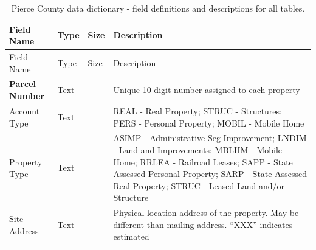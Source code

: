 \documentclass[
  english,
  letterpaper,
  DIV=11,
  numbers=noendperiod]{scrreprt}
\begin{document}
\begin{longtable}[]{@{}
  >{\raggedright\arraybackslash}p{}
  >{\raggedright\arraybackslash}p{}
  >{\raggedright\arraybackslash}p{}
  >{\raggedright\arraybackslash}p{}@{}}
\caption{Pierce County data dictionary - field definitions and
descriptions for all tables.}\label{tbl-data-dictionary}\tabularnewline
\toprule\noalign{}
\begin{minipage}[b]{\linewidth}\raggedright
Field Name
\end{minipage} & \begin{minipage}[b]{\linewidth}\raggedright
Type
\end{minipage} & \begin{minipage}[b]{\linewidth}\raggedright
Size
\end{minipage} & \begin{minipage}[b]{\linewidth}\raggedright
Description
\end{minipage} \\
\midrule\noalign{}
\endfirsthead
\toprule\noalign{}
\begin{minipage}[b]{\linewidth}\raggedright
Field Name
\end{minipage} & \begin{minipage}[b]{\linewidth}\raggedright
Type
\end{minipage} & \begin{minipage}[b]{\linewidth}\raggedright
Size
\end{minipage} & \begin{minipage}[b]{\linewidth}\raggedright
Description
\end{minipage} \\
\midrule\noalign{}
\endhead
\bottomrule\noalign{}
\endlastfoot
\textbf{Parcel Number} & Text & 10 & Unique 10 digit number assigned to
each property \\
Account Type & Text & 5 & REAL - Real Property; STRUC - Structures; PERS
- Personal Property; MOBIL - Mobile Home \\
Property Type & Text & 5 & ASIMP - Administrative Seg Improvement; LNDIM
- Land and Improvements; MBLHM - Mobile Home; RRLEA - Railroad Leases;
SAPP - State Assessed Personal Property; SARP - State Assessed Real
Property; STRUC - Leased Land and/or Structure \\
Site Address & Text & 50 & Physical location address of the property.
May be different than mailing address. ``XXX'' indicates estimated

\end{longtable}
\end{document}
